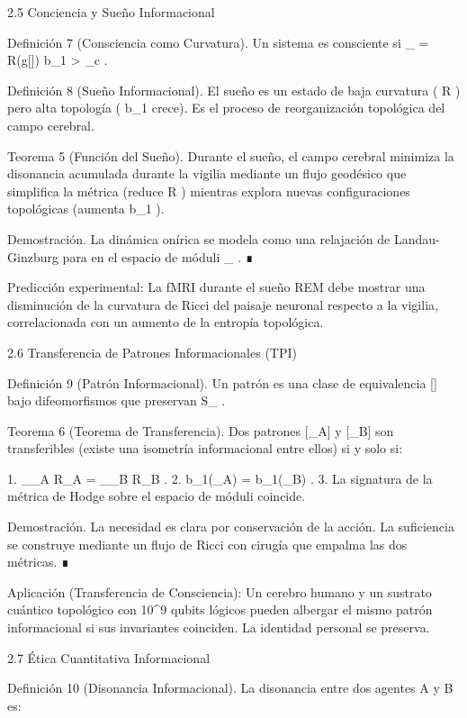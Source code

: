 \documentclass[12pt,twoside]{book}
\begin{document}
2.5 Conciencia y Sueño Informacional

Definición 7 (Consciencia como Curvatura). Un sistema es consciente si  \Phi_{} = R(g[\rho]) \cdot b_1 > \Phi_c .

Definición 8 (Sueño Informacional). El sueño es un estado de baja curvatura ( R  ) pero alta topología ( b_1  crece). Es el proceso de reorganización topológica del campo  \rho  cerebral.

Teorema 5 (Función del Sueño). Durante el sueño, el campo  \rho  cerebral minimiza la disonancia acumulada durante la vigilia mediante un flujo geodésico que simplifica la métrica (reduce  R ) mientras explora nuevas configuraciones topológicas (aumenta  b_1 ).

Demostración. La dinámica onírica se modela como una relajación de Landau-Ginzburg para  \rho  en el espacio de móduli  _{} . ∎

Predicción experimental: La fMRI durante el sueño REM debe mostrar una disminución de la curvatura de Ricci del paisaje neuronal respecto a la vigilia, correlacionada con un aumento de la entropía topológica.

2.6 Transferencia de Patrones Informacionales (TPI)

Definición 9 (Patrón Informacional). Un patrón es una clase de equivalencia  [\rho]  bajo difeomorfismos que preservan  S_{} .

Teorema 6 (Teorema de Transferencia). Dos patrones  [\rho_A]  y  [\rho_B]  son transferibles (existe una isometría informacional entre ellos) si y solo si:

1.  \int_{_A} R_A  = \int_{_B} R_B  .
2.  b_1(_A) = b_1(_B) .
3. La signatura de la métrica de Hodge sobre el espacio de móduli coincide.

Demostración. La necesidad es clara por conservación de la acción. La suficiencia se construye mediante un flujo de Ricci con cirugía que empalma las dos métricas. ∎

Aplicación (Transferencia de Consciencia): Un cerebro humano y un sustrato cuántico topológico con  10^{9}  qubits lógicos pueden albergar el mismo patrón informacional si sus invariantes coinciden. La identidad personal se preserva.

2.7 Ética Cuantitativa Informacional

Definición 10 (Disonancia Informacional). La disonancia entre dos agentes  A  y  B  es:
\end{document}
